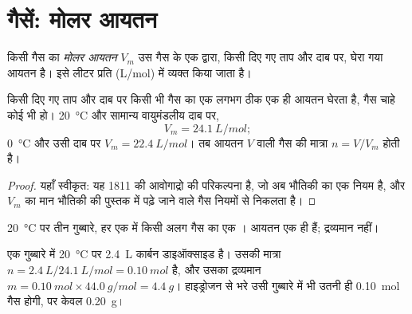 \section{गैसें: मोलर आयतन}

\begin{definition}[मोलर आयतन]\label{def:g10:the-mole:molar-volume}
किसी गैस का \emph{मोलर आयतन} $V_m$ उस गैस के एक  द्वारा,
किसी दिए गए ताप और दाब पर, घेरा गया आयतन है।
इसे लीटर प्रति  (\si{L/mol}) में व्यक्त किया जाता है।
\end{definition}

\begin{proposition}[सभी गैसों का मोलर आयतन एक ही होता है]\label{prop:g10:the-mole:avogadro-law}
किसी दिए गए ताप और दाब पर किसी भी गैस का एक  लगभग ठीक एक ही आयतन घेरता है,
गैस चाहे कोई भी हो। \qty{20}{\celsius} और
सामान्य वायुमंडलीय दाब पर,
\[
  V_m = \qty{24.1}{L/mol};
\]
\qty{0}{\celsius} और उसी दाब पर $V_m = \qty{22.4}{L/mol}$। तब
आयतन $V$ वाली गैस की मात्रा $n = V / V_m$ होती है।
\end{proposition}

\begin{proof}
यहाँ स्वीकृत: यह 1811 की आवोगाद्रो की परिकल्पना है, जो अब भौतिकी का एक नियम है,
और $V_m$ का मान भौतिकी की पुस्तक में पढ़े जाने वाले गैस नियमों से
निकलता है।
\end{proof}

\begin{omfigure}

{\small \qty{20}{\celsius} पर तीन गुब्बारे, हर एक में किसी अलग गैस का एक ।
आयतन एक ही हैं; द्रव्यमान नहीं।}
\end{omfigure}


\begin{example}[कार्बन डाइऑक्साइड का गुब्बारा]\label{ex:g10:the-mole:balloon}
एक गुब्बारे में \qty{20}{\celsius} पर \qty{2.4}{L} कार्बन डाइऑक्साइड है।
उसकी मात्रा $n = \qty{2.4}{L} / \qty{24.1}{L/mol} = \qty{0.10}{mol}$ है,
और उसका द्रव्यमान $m = \qty{0.10}{mol} \times \qty{44.0}{g/mol} =
\qty{4.4}{g}$। हाइड्रोजन से भरे उसी गुब्बारे में भी उतनी ही
\qty{0.10}{mol} गैस होगी, पर केवल \qty{0.20}{g}।
\end{example}

